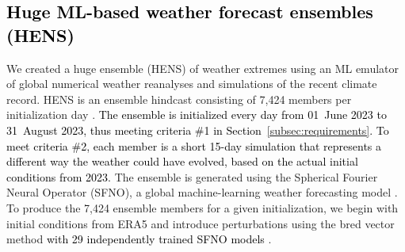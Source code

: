 \documentclass[draft]{agujournal2019}
\renewcommand{\st}[1]{\unskip}
\newcommand{\newTxt}{\textcolor{black}}
\begin{document}

\subsection{\st{Overview of HENS} \newTxt{Huge ML-based weather forecast ensembles (HENS)}}
\label{ssec:HENS}


We created a  huge ensemble (HENS) of weather extremes using an ML emulator of global numerical weather reanalyses and simulations of the recent climate record.  
\st{Our goal is to conduct the first studies of whether massive ensembles from ML emulators improve the ability to simulate ``low likelihood, high-impact'' (LLHI) weather events, using terminology from the sixth Intergovernmental Panel on Climate Change Report, which states that we currently have low confidence in current and future projections of LLHIs (Seneviratne et al., 2021).
Studies of LLHI extreme weather and climate events require massive ensembles to capture long tails of multivariate distributions (Hall et al., 2023). Until recently, generating 1,000- or 10,000-member ensembles of high-resolution hindcasts was exceptionally challenging because of prohibitive compute costs. The scientific community has recognized, however, that such massive ensembles are needed to characterize LLHIs (Thompson et al., 2017).} 
HENS is an ensemble hindcast consisting of 7,424 members per initialization day \citep{Mahesh2024hugeensemblesidesign, Mahesh2024hugeensemblespartii}. \newTxt{The ensemble is initialized every day from 01~June 2023 to 31~August 2023, thus meeting criteria \#1 in Section~\ref{subsec:requirements}. To meet criteria \#2, each member is a short 15-day simulation that represents a different way the weather could have evolved, based on the actual initial conditions from 2023.  } The ensemble is generated using the Spherical Fourier Neural Operator (SFNO), a global machine-learning weather forecasting model \citep{Bonev2023}. To produce the 7,424 ensemble members for a given initialization, we begin with initial conditions from ERA5 and introduce perturbations using the bred vector method \newTxt{with 29 independently trained SFNO models} \citep{Mahesh2024hugeensemblesidesign}. 
\st{This method generates perturbations aligned with the fastest-growing directions in the model state space, producing a diverse set of initial conditions that reflect uncertainties in the atmospheric state.  We combine bred vector initial condition perturbations with an estimate of model uncertainty by using 29 independently trained SFNO models.} 
\end{document}
